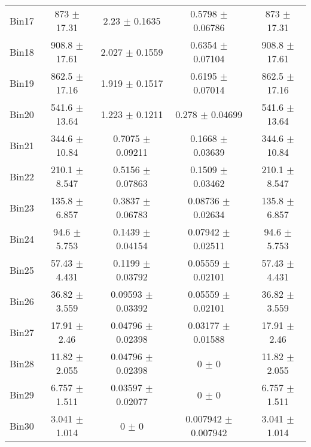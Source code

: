 \begin{tabular}{@{\extracolsep{4pt}}lcccc@{}}
     Bin17 & 873 $\pm$ 17.31 & 2.23 $\pm$ 0.1635 & 0.5798 $\pm$ 0.06786 & 873 $\pm$ 17.31 \\ 
     Bin18 & 908.8 $\pm$ 17.61 & 2.027 $\pm$ 0.1559 & 0.6354 $\pm$ 0.07104 & 908.8 $\pm$ 17.61 \\ 
     Bin19 & 862.5 $\pm$ 17.16 & 1.919 $\pm$ 0.1517 & 0.6195 $\pm$ 0.07014 & 862.5 $\pm$ 17.16 \\ 
     Bin20 & 541.6 $\pm$ 13.64 & 1.223 $\pm$ 0.1211 & 0.278 $\pm$ 0.04699 & 541.6 $\pm$ 13.64 \\ 
     Bin21 & 344.6 $\pm$ 10.84 & 0.7075 $\pm$ 0.09211 & 0.1668 $\pm$ 0.03639 & 344.6 $\pm$ 10.84 \\ 
     Bin22 & 210.1 $\pm$ 8.547 & 0.5156 $\pm$ 0.07863 & 0.1509 $\pm$ 0.03462 & 210.1 $\pm$ 8.547 \\ 
     Bin23 & 135.8 $\pm$ 6.857 & 0.3837 $\pm$ 0.06783 & 0.08736 $\pm$ 0.02634 & 135.8 $\pm$ 6.857 \\ 
     Bin24 & 94.6 $\pm$ 5.753 & 0.1439 $\pm$ 0.04154 & 0.07942 $\pm$ 0.02511 & 94.6 $\pm$ 5.753 \\ 
     Bin25 & 57.43 $\pm$ 4.431 & 0.1199 $\pm$ 0.03792 & 0.05559 $\pm$ 0.02101 & 57.43 $\pm$ 4.431 \\ 
     Bin26 & 36.82 $\pm$ 3.559 & 0.09593 $\pm$ 0.03392 & 0.05559 $\pm$ 0.02101 & 36.82 $\pm$ 3.559 \\ 
     Bin27 & 17.91 $\pm$ 2.46 & 0.04796 $\pm$ 0.02398 & 0.03177 $\pm$ 0.01588 & 17.91 $\pm$ 2.46 \\ 
     Bin28 & 11.82 $\pm$ 2.055 & 0.04796 $\pm$ 0.02398 & 0 $\pm$ 0 & 11.82 $\pm$ 2.055 \\ 
     Bin29 & 6.757 $\pm$ 1.511 & 0.03597 $\pm$ 0.02077 & 0 $\pm$ 0 & 6.757 $\pm$ 1.511 \\ 
     Bin30 & 3.041 $\pm$ 1.014 & 0 $\pm$ 0 & 0.007942 $\pm$ 0.007942 & 3.041 $\pm$ 1.014 \\ 
\hline\hline
  \end{tabular}
